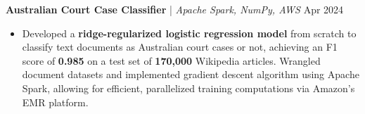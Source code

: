 \textbf{Australian Court Case Classifier} | \textit{Apache Spark, NumPy, AWS} \hfill Apr 2024 \par
\begin{itemize}
	\item Developed a \textbf{ridge-regularized logistic regression model} from scratch to classify text documents as Australian court cases or not, achieving an F1 score of \textbf{0.985} on a test set of \textbf{170,000} Wikipedia articles. Wrangled document datasets and implemented gradient descent algorithm using Apache Spark, allowing for efficient, parallelized training computations via Amazon's EMR platform.
\end{itemize}